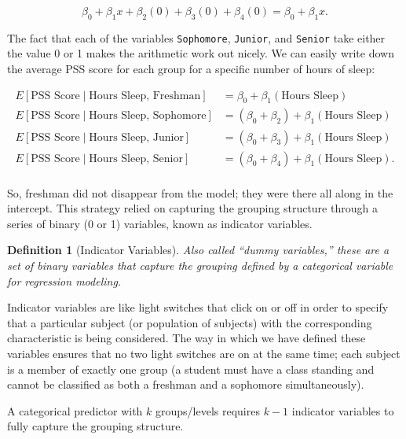 \documentclass[
]{book}
\theoremstyle{plain}
\theoremstyle{mydefn}
\newtheorem{definition}{Definition}[chapter]
\theoremstyle{myexmpl}
\theoremstyle{remark}
\begin{document}
\[\beta_0 + \beta_1 x + \beta_2 (0) + \beta_3 (0) + \beta_4 (0) = \beta_0 + \beta_1 x.\]

The fact that each of the variables \texttt{Sophomore}, \texttt{Junior}, and \texttt{Senior} take either the value 0 or 1 makes the arithmetic work out nicely. We can easily write down the average PSS score for each group for a specific number of hours of sleep:

\[
\begin{aligned}
  E\left[\text{PSS Score} \mid \text{Hours Sleep, Freshman}\right]
    &= \beta_0 + \beta_1 (\text{Hours Sleep}) \\
  E\left[\text{PSS Score} \mid \text{Hours Sleep, Sophomore}\right]
    &= \left(\beta_0 + \beta_2\right) + \beta_1 (\text{Hours Sleep})\\
  E\left[\text{PSS Score} \mid \text{Hours Sleep, Junior}\right]
    &= \left(\beta_0 + \beta_3\right) + \beta_1 (\text{Hours Sleep}) \\
  E\left[\text{PSS Score} \mid \text{Hours Sleep, Senior}\right]
    &= \left(\beta_0 + \beta_4\right) + \beta_1 (\text{Hours Sleep}). \\
\end{aligned}
\]

So, freshman did not disappear from the model; they were there all along in the intercept. This strategy relied on capturing the grouping structure through a series of binary (0 or 1) variables, known as indicator variables.

\begin{definition}[Indicator Variables]
\protect\hypertarget{def:defn-indicator-variables}{}{\label{def:defn-indicator-variables} {} }Also called ``dummy variables,'' these are a set of binary variables that capture the grouping defined by a categorical variable for regression modeling.
\end{definition}

Indicator variables are like light switches that click on or off in order to specify that a particular subject (or population of subjects) with the corresponding characteristic is being considered. The way in which we have defined these variables ensures that no two light switches are on at the same time; each subject is a member of exactly one group (a student must have a class standing and cannot be classified as both a freshman and a sophomore simultaneously).

\begin{rmdtip}
A categorical predictor with \(k\) groups/levels requires \(k-1\) indicator variables to fully capture the grouping structure.
\end{rmdtip}
\end{document}
